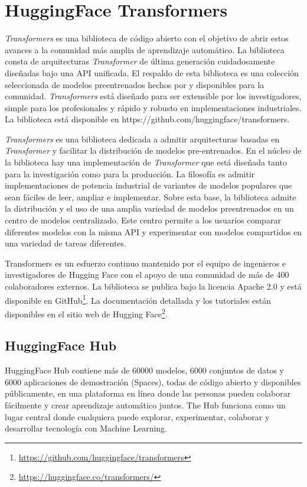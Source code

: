 \section{HuggingFace Transformers}
\textit{Transformers} \parencite{95} es una biblioteca de código abierto con el objetivo de abrir estos avances a la comunidad más amplia de aprendizaje automático. La biblioteca consta de arquitecturas \textit{Transformer} de última generación cuidadosamente diseñadas bajo una API unificada. El respaldo de esta biblioteca es una colección seleccionada de modelos preentrenados hechos por y disponibles para la comunidad. \textit{Transformers} está diseñado para ser extensible por los investigadores, simple para los profesionales y rápido y robusto en implementaciones industriales. La biblioteca está disponible en https://github.com/huggingface/transformers.

\textit{Transformers} es una biblioteca dedicada a admitir arquitecturas basadas en \textit{Transformer} y facilitar la distribución de modelos pre-entrenados. En el núcleo de la biblioteca hay una implementación de \textit{Transformer} que está diseñada tanto para la investigación como para la producción. La filosofía es admitir implementaciones de potencia industrial de variantes de modelos populares que sean fáciles de leer, ampliar e implementar. Sobre esta base, la biblioteca admite la distribución y el uso de una amplia variedad de modelos preentrenados en un centro de modelos centralizado. Este centro permite a los usuarios comparar diferentes modelos con la misma API y experimentar con modelos compartidos en una variedad de tareas diferentes.

Transformers es un esfuerzo continuo mantenido por el equipo de ingenieros e investigadores de Hugging Face con el apoyo de una comunidad de más de 400 colaboradores externos. La biblioteca se publica bajo la licencia Apache 2.0 y está disponible en GitHub\footnote[1]{\url{https://github.com/huggingface/transformers}}. La documentación detallada y los tutoriales están disponibles en el sitio web de Hugging Face\footnote[2]{\url{https://huggingface.co/transformers/}}.

\subsection{HuggingFace Hub}
HuggingFace Hub contiene más de 60000 modelos, 6000 conjuntos de datos y 6000 aplicaciones de demostración (Spaces), todas de código abierto y disponibles públicamente, en una plataforma en línea donde las personas pueden colaborar fácilmente y crear aprendizaje automático juntos. The Hub funciona como un lugar central donde cualquiera puede explorar, experimentar, colaborar y desarrollar tecnología con Machine Learning. 


